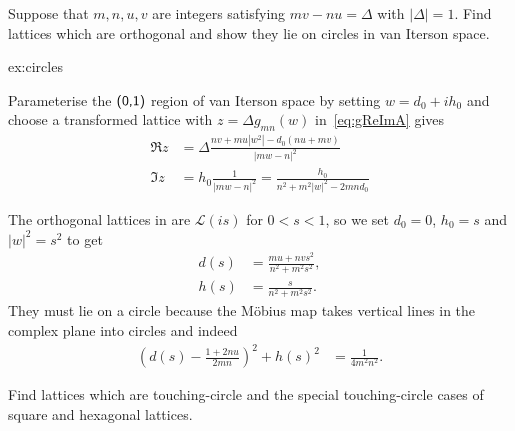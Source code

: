 \begin{jExercise}\label{ex:circles}
	Suppose that $m ,n ,u, v$ are integers satisfying  $m v - n u =\Delta $ with $|\Delta|=1$.  Find   lattices which are  orthogonal and show they lie on circles in van Iterson space.
\end{jExercise}
\begin{jAnswer}{ex:circles}{
	Parameterise the  $\textsf{(0,1)}$ region of van Iterson space by setting $w=d_0+ih_0$ and choose a transformed lattice with $z=\Delta g_{mn}(w)$ in~\eqref{eq:gReImA} gives
	\begin{align}
		\Re z &= 
		\Delta \frac{n v + m u| w^2|	- d_0( n u + m v)}{|m w-n|^2} 
		\label{eq:rez}
		\\
		\Im z &=	h_0 
		\frac{ 1}{|m w-n|^2} =  
		\frac{ h_0}{n^2 + m^2 |w|^2 - 2 m n d_0}
		\label{eq:gReIBm}
	\end{align}
	
	The orthogonal lattices in  are $\mathcal{L}(is)$ for $0<s<1$, so we set $d_0=0$, $h_0=s$ and $|w|^2=s^2$ to get 
	\begin{align}
		d(s) &= \frac{ m u +  n v s^2  }{n^2 +m^2 s^2 },
		\\
		h(s)  &= \frac{s}{n^2 +m^2 s^2  }.
	\end{align}
	They must lie on a circle because the M\"obius map takes vertical lines in the complex plane into circles and indeed
	\begin{align}
		\left( d(s)- \frac{1+2nu}{2mn}\right)^2 + h(s)^2 &= \frac{1}{4 m^2 n^2}.
	\end{align}
}
\end{jAnswer}

\begin{jExercise}\label{ex:shcircles}{
	Find   lattices which are touching-circle and the special touching-circle cases of square and hexagonal lattices. 
	\label{ex:orthogonal}
}\end{jExercise}

